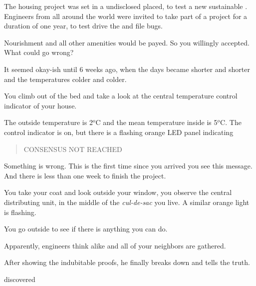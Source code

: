 \documentclass[../main.tex]{subfiles}
\begin{document}
The housing project was set in a undisclosed placed, to test a new sustainable \dhn{}.
Engineers from all around the world were invited to take part of a project for a duration of one year, to test drive the \dhn{} and file bugs.

Nourishment and all other amenities would be payed.
So you willingly accepted.
What could go wrong?

It seemed okay-ish until $6$ weeks ago, when the days became shorter and shorter and the temperatures colder and colder.

You climb out of the bed and take a look at the central temperature control indicator of your house.

The outside temperature is 2$^{o}$C and the mean temperature inside is 5$^{o}$C.
The control indicator is on, but there is a flashing orange LED panel indicating

\begin{quote}
  CONSENSUS NOT REACHED
\end{quote}

Something is wrong.
This is the first time since you arrived you see this message.
And there is less than one week to finish the project.

You take your coat and look outside your window, you observe the central distributing unit, in the middle of the \emph{cul-de-sac} you live.
A similar orange light is flashing.

You go outside to see if there is anything you can do.

Apparently, engineers think alike and all of your neighbors are gathered.



After showing the indubitable proofs, he finally breaks down and tells the truth.



discovered


\end{document}
